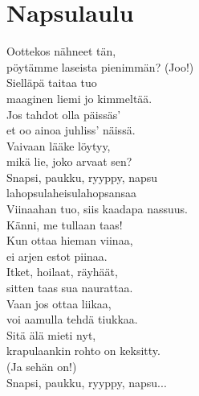 \section{Napsulaulu}
Oottekos nähneet tän,\\
pöytämme laseista pienimmän? (Joo!)\\
Sielläpä taitaa tuo\\
maaginen liemi jo kimmeltää.\\

Jos tahdot olla päissäs’\\
et oo ainoa juhliss’ näissä.\\
Vaivaan lääke löytyy,\\
mikä lie, joko arvaat sen?\\

Snapsi, paukku, ryyppy, napsu\\
lahopsulaheisulahopsansaa\\
Viinaahan tuo, siis kaadapa nassuus.\\
Känni, me tullaan taas!\\

Kun ottaa hieman viinaa,\\
ei arjen estot piinaa.\\
Itket, hoilaat, räyhäät,\\
sitten taas sua naurattaa.\\

Vaan jos ottaa liikaa,\\
voi aamulla tehdä tiukkaa.\\
Sitä älä mieti nyt,\\
krapulaankin rohto on keksitty.\\
(Ja sehän on!)\\

Snapsi, paukku, ryyppy, napsu...